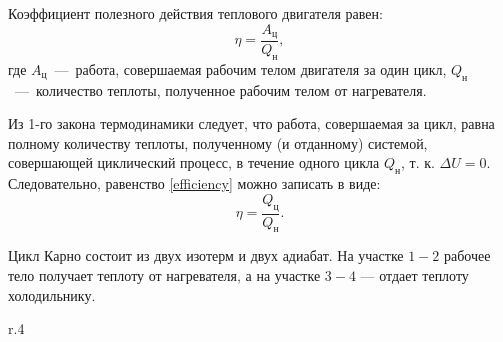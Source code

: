 \solving{}

Коэффициент полезного действия теплового двигателя равен:
\begin{equation} \label{efficiency}
  \eta = \frac{A_\text{ц}}{Q_\text{н}},
\end{equation}
где $A_\text{ц}$~---~работа, совершаемая рабочим телом двигателя за один цикл,
$Q_\text{н}$~---~количество теплоты, полученное рабочим телом от нагревателя.

Из 1-го закона термодинамики следует, что работа, совершаемая за цикл,
равна полному количеству теплоты, полученному (и отданному) системой,
совершающей циклический процесс, в течение одного цикла
$Q_\text{н}$, т. к. $\Delta U = 0$. Следовательно,
равенство \ref{efficiency} можно записать в виде:
\begin{equation}
  \eta = \frac{Q_\text{ц}}{Q_\text{н}}.
\end{equation}

Цикл Карно состоит из двух изотерм и двух адиабат. На участке $1-2$
рабочее тело получает теплоту от нагревателя, а на участке $3-4$ --- отдает
теплоту холодильнику.
\begin{wrapfigure}[14]{r}{.4\textwidth}
  \caption{}
\end{wrapfigure}

